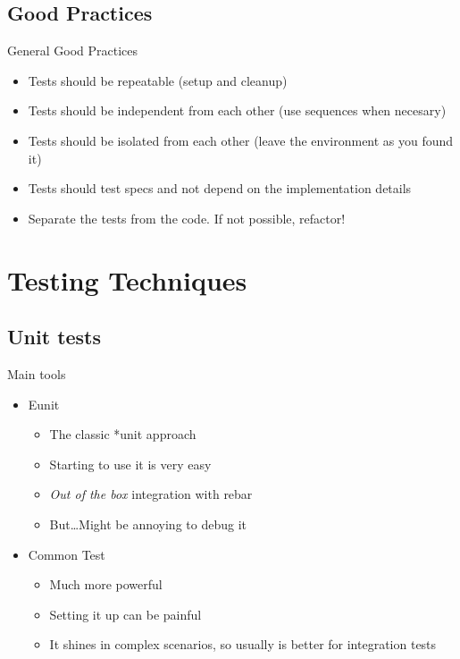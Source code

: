 \documentclass[aspectratio=169]{beamer}
\begin{document}
\subsection*{Good Practices}
\label{good_practices}

\begin{frame}{General Good Practices}
    \begin{itemize}
    \item Tests should be repeatable (setup and cleanup)
    \pause
    \item Tests should be independent from each other (use sequences when necesary)
    \pause
    \item Tests should be isolated from each other (leave the environment as you found it)
    \pause
    \item Tests should test specs and not depend on the implementation details
    \pause
    \item Separate the tests from the code. If not possible, refactor!
    \end{itemize}
\end{frame}

\section{Testing Techniques}
\label{testing_techniques}

\subsection*{Unit tests}
\label{unit_testing}

\begin{frame}{Main tools}
    \begin{itemize}
    \pause
    \item Eunit
        \begin{itemize}
        \item The classic *unit approach
        \item Starting to use it is very easy
        \item \emph{Out of the box} integration with rebar
        \item But\dots Might be annoying to debug it
        \end{itemize}
    \pause
    \item Common Test
        \begin{itemize}
        \item Much more powerful
        \item Setting it up can be painful
        \item It shines in complex scenarios, so usually is better for integration tests
        \end{itemize}
    \end{itemize}
\end{frame}
\end{document}
